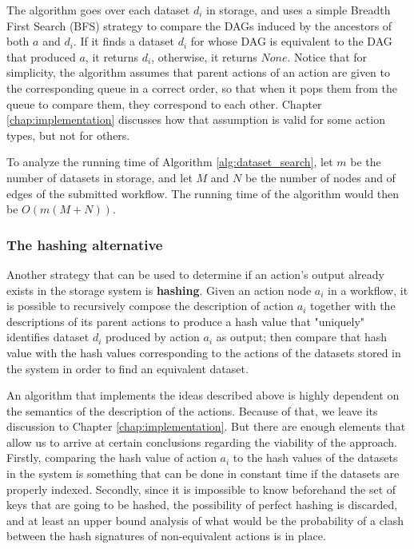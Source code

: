The algorithm goes over each dataset $d_i$ in storage, and uses a simple Breadth First Search (BFS) strategy to compare the DAGs induced by the ancestors of both $a$ and $d_i$.  If it finds a dataset $d_i$ for whose DAG is equivalent to the DAG that produced $a$, it returns $d_i$, otherwise, it returns $None$.  Notice that for simplicity, the algorithm assumes that parent actions of an action are given to the corresponding queue in a correct order, so that when it pops them from the queue to compare them, they correspond to each other.  Chapter \ref{chap:implementation} discusses how that assumption is valid for some action types, but not for others.

To analyze the running time of Algorithm \ref{alg:dataset_search}, let $m$ be the number of datasets in storage, and let $M$ and $N$ be the number of nodes and of edges of the submitted workflow.  The running time of the algorithm would then be $O(m (M + N))$.

\subsubsection{The hashing alternative}
\label{sec:encryption}
Another strategy that can be used to determine if an action's output already exists in the storage system is \textbf{hashing}.  Given an action node $a_i$ in a workflow, it is possible to recursively compose the description of action $a_i$ together with the descriptions of its parent actions to produce a hash value that "uniquely" identifies dataset $d_i$ produced by action $a_i$ as output; then compare that hash value with the hash values corresponding to the actions of the datasets stored in the system in order to find an equivalent dataset.

An algorithm that implements the ideas described above is highly dependent on the semantics of the description of the actions.  Because of that, we leave its discussion to Chapter \ref{chap:implementation}.  But there are enough elements that allow us to arrive at certain conclusions regarding the viability of the approach.  Firstly, comparing the hash value of action $a_i$ to the hash values of the datasets in the system is something that can be done in constant time if the datasets are properly indexed.  Secondly, since it is impossible to know beforehand the set of keys that are going to be hashed, the possibility of perfect hashing is discarded, and at least an upper bound analysis of what would be the probability of a clash between the hash signatures of non-equivalent actions is in place.  


